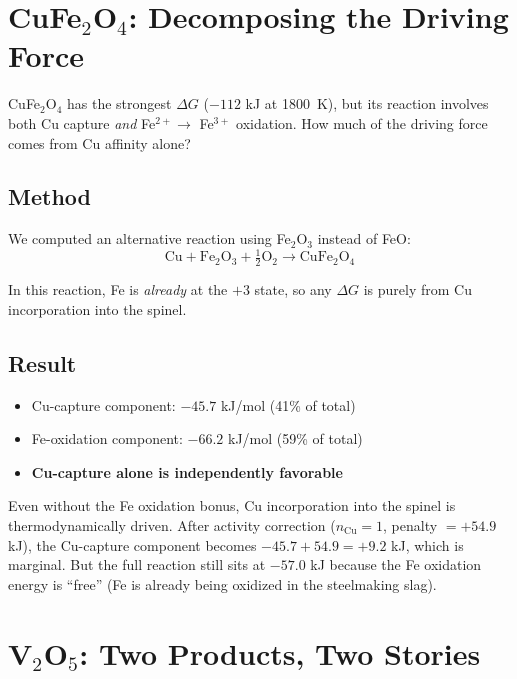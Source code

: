 \documentclass[11pt]{article}
\begin{document}
\section{CuFe$_2$O$_4$: Decomposing the Driving Force}

CuFe$_2$O$_4$ has the strongest $\Delta G$ ($-112$ kJ at \SI{1800}{\kelvin}), but its reaction involves both Cu capture \textit{and} Fe$^{2+} \to$ Fe$^{3+}$ oxidation. How much of the driving force comes from Cu affinity alone?

\subsection{Method}

We computed an alternative reaction using Fe$_2$O$_3$ instead of FeO:
\[
    \text{Cu} + \text{Fe}_2\text{O}_3 + \tfrac{1}{2}\text{O}_2 \to \text{CuFe}_2\text{O}_4
\]

In this reaction, Fe is \textit{already} at the $+3$ state, so any $\Delta G$ is purely from Cu incorporation into the spinel.

\subsection{Result}

\begin{itemize}[leftmargin=*]
    \item Cu-capture component: $-45.7$ kJ/mol (41\% of total)
    \item Fe-oxidation component: $-66.2$ kJ/mol (59\% of total)
    \item \textbf{Cu-capture alone is independently favorable}
\end{itemize}

Even without the Fe oxidation bonus, Cu incorporation into the spinel is thermodynamically driven. After activity correction ($n_{\text{Cu}} = 1$, penalty $= +54.9$ kJ), the Cu-capture component becomes $-45.7 + 54.9 = +9.2$ kJ, which is marginal. But the full reaction still sits at $-57.0$ kJ because the Fe oxidation energy is ``free'' (Fe is already being oxidized in the steelmaking slag).


\section{V$_2$O$_5$: Two Products, Two Stories}
\end{document}
